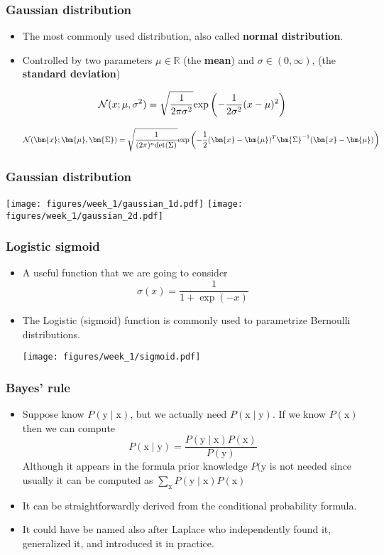 \documentclass[notes]{beamer}          %
\newcommand{\vect}[1]{\bm{#1}}
\newcommand{\field}[1]{\mathbb{#1}}
\newcommand{\R}{\field{R}}
\begin{document}
\begin{frame}
\frametitle{Gaussian distribution}
\begin{itemize}
    \item The most commonly used distribution, also called {\bf normal distribution}.
    \item Controlled by two parameters $\mu \in \R$ (the {\bf mean}) and $\sigma \in (0, \infty)$, (the {\bf standard deviation})

    $$
    {\cal N}(x ; \mu, \sigma^2) = \sqrt{\frac{1}{2 \pi \sigma^2}} \mbox{exp} \left (-\frac{1}{2 \sigma^2}(x - \mu)^2 \right )
    $$

    $$
    {\cal N}(\vect{x} ; \vect{\mu}, \vect{\Sigma}) = \sqrt{\frac{1}{(2 \pi)^n \mbox{det}(\Sigma)}} \mbox{exp} \left (-\frac{1}{2} (\vect{x} - \vect{\mu})^T \vect{\Sigma}^{-1} (\vect{x} - \vect{\mu}) \right )
    $$


\end{itemize}
\end{frame}


\begin{frame}
\frametitle{Gaussian distribution}
\begin{center}
\texttt{[image: figures/week\_1/gaussian\_1d.pdf]}
\hfill
\texttt{[image: figures/week\_1/gaussian\_2d.pdf]}
\end{center}
\end{frame}

\begin{frame}
\frametitle{Logistic sigmoid}
\begin{itemize}
    \item A useful function that we are going to consider
    $$\sigma(x) = \frac{1}{1 + \exp{(-x)}}$$
    \item The Logistic (sigmoid) function is commonly used to parametrize Bernoulli distributions.
    \begin{center}
    \texttt{[image: figures/week\_1/sigmoid.pdf]}
    \end{center}

\end{itemize}
\end{frame}


\begin{frame}
\frametitle{Bayes' rule}
\begin{itemize}
    \item Suppose know $P(\text{y} \mid \text{x})$, but we actually need $P(\text{x} \mid \text{y})$. If we know $P(\text{x})$ then we can compute
    $$
        P(\text{x} \mid \text{y}) = \frac{P(\text{y} \mid \text{x})P(\text{x})}{P(\text{y})}
    $$
    Although it appears in the formula prior knowledge $P(\text{y}$ is not needed since usually it can be computed as $\sum_{\text{x}} P(\text{y} \mid \text{x})P(\text{x})$
    \item It can be straightforwardly derived from the conditional probability formula.
    \item It could have be named also after Laplace who independently found it, generalized it, and introduced it in practice.
\end{itemize}
\end{frame}
\end{document}
